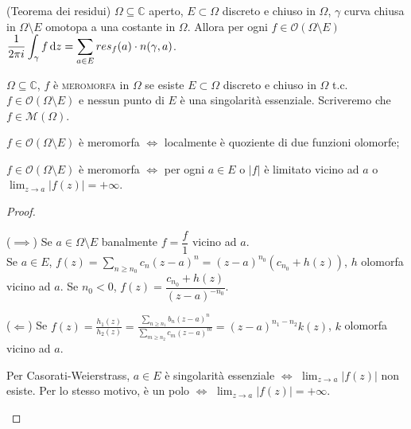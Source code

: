 \begin{thm}
  (Teorema dei residui) $\Omega \subseteq \mathbb{C}$ aperto, $E \subset \Omega$ discreto e chiuso in $\Omega$, $\gamma$ curva chiusa in $\Omega \setminus E$ omotopa a una costante in $\Omega$.
  Allora per ogni $f \in \mathcal{O}(\Omega \setminus E)$ $\displaystyle \frac{1}{2\pi i} \int_{\gamma} f \mathop{}\!\mathrm{d} z=\sum_{a \in E} res_f(a) \cdot n(\gamma, a)$.
\end{thm}

\begin{defn}
  $\Omega \subseteq \mathbb{C}$, $f$ è \textsc{meromorfa} in $\Omega$ se esiste $E \subset \Omega$ discreto e chiuso in $\Omega$ t.c. $f \in \mathcal{O}(\Omega \setminus E)$ e nessun punto di $E$ è una singolarità essenziale. Scriveremo che $f \in \mathcal{M}(\Omega)$.
\end{defn}

\begin{prop}
  \begin{nlist}
    \item $f \in \mathcal{O}(\Omega \setminus E)$ è meromorfa $\iff$ localmente è quoziente di due funzioni olomorfe;
    \item $f \in \mathcal{O}(\Omega \setminus E)$ è meromorfa $\iff$ per ogni $a \in E$ o $|f|$ è limitato vicino ad $a$ o $\displaystyle \lim_{z \longrightarrow a} |f(z)|=+\infty$.
  \end{nlist}
\end{prop}

\begin{proof}
  \begin{nlist}
    \item ($\implies$) Se $a \in \Omega \setminus E$ banalmente $f=\dfrac{f}{1}$ vicino ad $a$. \\
    Se $a \in E$, $\displaystyle f(z)=\sum_{n \ge n_0} c_n(z-a)^n=(z-a)^{n_0}(c_{n_0}+h(z))$, $h$ olomorfa vicino ad $a$. Se $n_0<0$, $f(z)=\dfrac{c_{n_0}+h(z)}{(z-a)^{-n_0}}$.

    ($\Leftarrow$) Se $\displaystyle f(z)=\frac{h_1(z)}{h_2(z)}=\frac{\sum_{n \ge n_1} b_n(z-a)^n}{\sum_{m \ge n_2} c_m(z-a)^m}=(z-a)^{n_1-n_2}k(z)$, $k$ olomorfa vicino ad $a$.
    \item Per Casorati-Weierstrass, $a \in E$ è singolarità essenziale $\iff$ $\displaystyle \lim_{z \longrightarrow a} |f(z)|$ non esiste. Per lo stesso motivo, è un polo $\iff$ $\displaystyle \lim_{z \longrightarrow a} |f(z)|=+\infty$.
  \end{nlist}
\end{proof}

